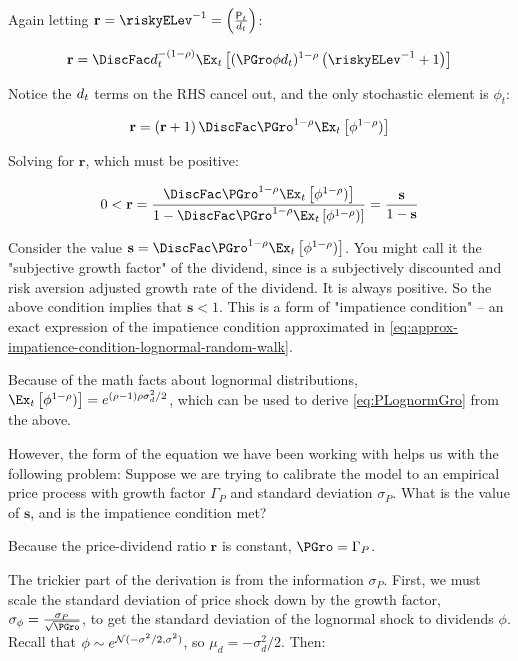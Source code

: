 \documentclass{\handout}
\begin{document}
 Again letting $\mathbf{r} = \riskyELev^{-1} = \left(\frac{\Price_{t}}{\dvdnd_{t}}\right)$:

\begin{equation}
  \mathbf{r} =  \DiscFac \dvdnd_{t}^{-(1-\CRRA)} \Ex_{t}\left[(\PGro \phi d_{t})^{1-\CRRA}\left(\riskyELev^{-1}+1\right)\right] 
 \end{equation}

 Notice the $d_{t}$ terms on the RHS cancel out, and the only stochastic element is $\phi_t$:

 \begin{equation}
  \mathbf{r} = \left(\mathbf{r}+1\right) \DiscFac \PGro^{1-\CRRA}\Ex_{t}\left[\phi^{1-\CRRA})\right] 
 \end{equation}

 Solving for $\mathbf{r}$, which must be positive:

  \begin{equation}
  0 < \mathbf{r} = \frac{\DiscFac \PGro^{1-\CRRA}\Ex_{t}\left[\phi^{1-\CRRA})\right] }{1 - \DiscFac \PGro^{1-\CRRA}\Ex_{t}\left[\phi^{1-\CRRA})\right]} = \frac{\mathbf{s}}{1 - \mathbf{s}}
 \end{equation}

Consider the value $\mathbf{s} = \DiscFac \PGro^{1-\CRRA}\Ex_{t}\left[\phi^{1-\CRRA})\right]$.
You might call it the "subjective growth factor" of the dividend, since is a subjectively discounted
and risk aversion adjusted growth rate of the dividend.
It is always positive.
So the above condition implies that $\mathbf{s} < 1$.
This is a form of "impatience condition" -- an exact expression of the impatience condition
approximated in \eqref{eq:approx-impatience-condition-lognormal-random-walk}. 

Because of the math facts about lognormal distributions, $\Ex_{t}\left[\phi^{1-\CRRA})\right] = e^{(\CRRA - 1)\CRRA \sigma^2_d / 2}$,
which can be used to derive \eqref{eq:PLognormGro} from the above.

However, the form of the equation we have been working with helps us with the following problem:
Suppose we are trying to calibrate the model to an empirical price process with growth factor $\Gamma_P$ and standard deviation $\sigma_P$.
What is the value of $\mathbf{s}$, and is the impatience condition met?

Because the price-dividend ratio $\mathbf{r}$ is constant, $\PGro = \Gamma_P$.

The trickier part of the derivation is from the information $\sigma_P$.
First, we must scale the standard deviation of price shock down by the growth factor, $\sigma_\phi = \frac{\sigma_P}{\sqrt{\PGro}}$,
to get the standard deviation of the lognormal shock to dividends $\phi$.
Recall that $\phi \sim e^{\mathcal{N}(-\sigma^{2}/2,\sigma^{2})}$, so $\mu_d = -\sigma^2_d/2$. Then:
\end{document}
